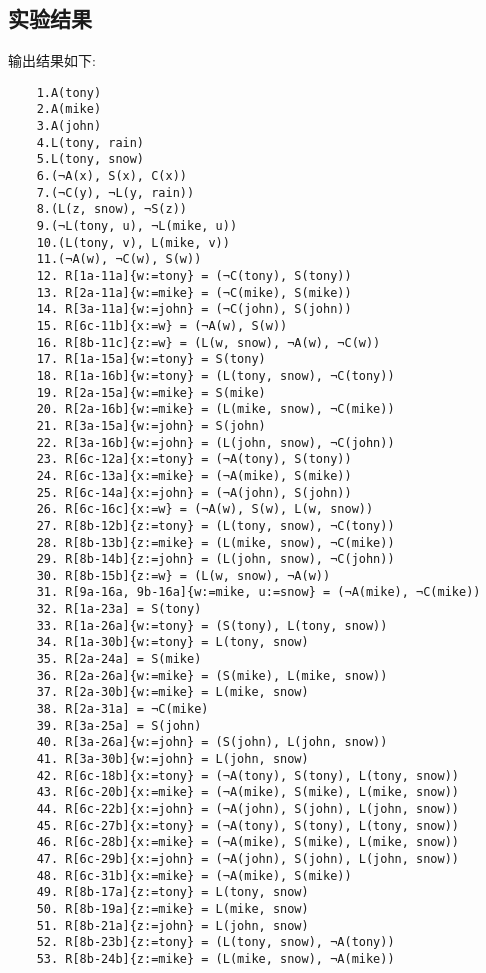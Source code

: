     \subsection{实验结果}
    输出结果如下:
    \begin{verbatim}
    1.A(tony)
    2.A(mike)
    3.A(john)
    4.L(tony, rain)
    5.L(tony, snow)
    6.(¬A(x), S(x), C(x))
    7.(¬C(y), ¬L(y, rain))
    8.(L(z, snow), ¬S(z))
    9.(¬L(tony, u), ¬L(mike, u))
    10.(L(tony, v), L(mike, v))
    11.(¬A(w), ¬C(w), S(w))
    12. R[1a-11a]{w:=tony} = (¬C(tony), S(tony))
    13. R[2a-11a]{w:=mike} = (¬C(mike), S(mike))
    14. R[3a-11a]{w:=john} = (¬C(john), S(john))
    15. R[6c-11b]{x:=w} = (¬A(w), S(w))
    16. R[8b-11c]{z:=w} = (L(w, snow), ¬A(w), ¬C(w))
    17. R[1a-15a]{w:=tony} = S(tony)
    18. R[1a-16b]{w:=tony} = (L(tony, snow), ¬C(tony))
    19. R[2a-15a]{w:=mike} = S(mike)
    20. R[2a-16b]{w:=mike} = (L(mike, snow), ¬C(mike))
    21. R[3a-15a]{w:=john} = S(john)
    22. R[3a-16b]{w:=john} = (L(john, snow), ¬C(john))
    23. R[6c-12a]{x:=tony} = (¬A(tony), S(tony))
    24. R[6c-13a]{x:=mike} = (¬A(mike), S(mike))
    25. R[6c-14a]{x:=john} = (¬A(john), S(john))
    26. R[6c-16c]{x:=w} = (¬A(w), S(w), L(w, snow))
    27. R[8b-12b]{z:=tony} = (L(tony, snow), ¬C(tony))
    28. R[8b-13b]{z:=mike} = (L(mike, snow), ¬C(mike))
    29. R[8b-14b]{z:=john} = (L(john, snow), ¬C(john))
    30. R[8b-15b]{z:=w} = (L(w, snow), ¬A(w))
    31. R[9a-16a, 9b-16a]{w:=mike, u:=snow} = (¬A(mike), ¬C(mike))
    32. R[1a-23a] = S(tony)
    33. R[1a-26a]{w:=tony} = (S(tony), L(tony, snow))
    34. R[1a-30b]{w:=tony} = L(tony, snow)
    35. R[2a-24a] = S(mike)
    36. R[2a-26a]{w:=mike} = (S(mike), L(mike, snow))
    37. R[2a-30b]{w:=mike} = L(mike, snow)
    38. R[2a-31a] = ¬C(mike)
    39. R[3a-25a] = S(john)
    40. R[3a-26a]{w:=john} = (S(john), L(john, snow))
    41. R[3a-30b]{w:=john} = L(john, snow)
    42. R[6c-18b]{x:=tony} = (¬A(tony), S(tony), L(tony, snow))
    43. R[6c-20b]{x:=mike} = (¬A(mike), S(mike), L(mike, snow))
    44. R[6c-22b]{x:=john} = (¬A(john), S(john), L(john, snow))
    45. R[6c-27b]{x:=tony} = (¬A(tony), S(tony), L(tony, snow))
    46. R[6c-28b]{x:=mike} = (¬A(mike), S(mike), L(mike, snow))
    47. R[6c-29b]{x:=john} = (¬A(john), S(john), L(john, snow))
    48. R[6c-31b]{x:=mike} = (¬A(mike), S(mike))
    49. R[8b-17a]{z:=tony} = L(tony, snow)
    50. R[8b-19a]{z:=mike} = L(mike, snow)
    51. R[8b-21a]{z:=john} = L(john, snow)
    52. R[8b-23b]{z:=tony} = (L(tony, snow), ¬A(tony))
    53. R[8b-24b]{z:=mike} = (L(mike, snow), ¬A(mike))

\end{verbatim}
